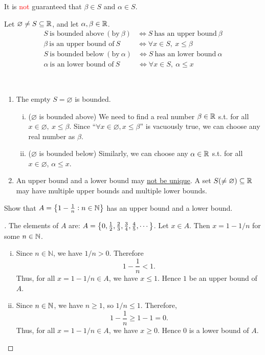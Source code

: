\documentclass[11pt,openany]{article}
\begin{document}
\begin{remark*}[\textcolor{red}{\bf Caution!}]
	It is \textcolor{red}{not} guaranteed that $\beta\in S$ and $\alpha\in S$.
\end{remark*}
\vfill
\begin{remark*}
	Let $\varnothing\neq S\subseteq\mathbb{R}$, and let $\alpha,\beta\in\mathbb{R}$.
	\begin{align*}
		S\ \text{is bounded above}\ (\text{by}\ \beta) &\iff S\ \text{has an upper bound}\ \beta\\
		\beta\ \text{is an upper bound of}\ S &\iff \forall x\in S,\ x\leq \beta
	\end{align*}
	\begin{align*}
		S\ \text{is bounded below}\ (\text{by}\ \alpha) &\iff S\ \text{has an lower bound}\ \alpha\\
		\alpha\ \text{is an lower bound of}\ S &\iff \forall x\in S,\ \alpha\leq x
	\end{align*}
\end{remark*}
\vfill
\begin{remark*}
\ \begin{enumerate}
	\item The empty $S=\varnothing$ is bounded.
	\begin{enumerate}[(i)]
		\item ($\varnothing$ is bounded above) We need to find a real number $\beta\in\mathbb{R}$ s.t. for all $x\in\varnothing,\ x\leq\beta$. Since ``$\forall x\in\varnothing, x\leq\beta$'' is vacuously true, we can choose any real number as $\beta$.
		\item ($\varnothing$ is bounded below) Similarly, we can choose any $\alpha\in\mathbb{R}$ s.t. for all $x\in\varnothing$, $\alpha\leq x$.
	\end{enumerate}
	\item An upper bound and a lower bound may \underline{not be unique}. A set \( S(\neq\varnothing)\subseteq\mathbb{R} \) may have multiple upper bounds and multiple lower bounds.
\end{enumerate}
\end{remark*}
\newpage
\begin{exercise*}
Show that $A=\set{1-\frac{1}{n}:n\in\mathbb{N}}$ has an upper bound and a lower bound.
\begin{proof}[\sol]
	The elements of $A$ are: $A=\set{0, \frac{1}{2}, \frac{2}{3}, \frac{3}{4}, \frac{4}{5}, \cdots}$. Let $x\in A$. Then $x=1-1/n$ for some $n\in\mathbb{N}$. \begin{enumerate}[(i)]
		\item Since $n\in\mathbb{N}$, we have $1/n>0$. Therefore \[
		1-\frac{1}{n}<1.
		\] Thus, for all $x=1-1/n\in A$, we have $x\leq 1$. Hence $1$ be an upper bound of $A$.
		\item Since $n\in\mathbb{N}$, we have $n\geq 1$, so $1/n\leq 1$. Therefore, \[
		1-\frac{1}{n}\geq 1-1=0.
		\] Thus, for all $x=1-1/n\in A$, we have $x\geq 0$. Hence $0$ is a lower bound of $A$.
	\end{enumerate}
	\begin{center}
	
	\end{center}
\end{proof}
\end{exercise*}
\end{document}
